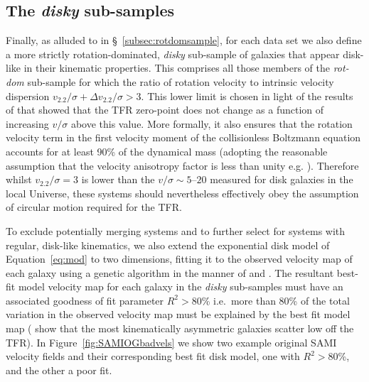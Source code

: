 \documentclass[a4paper,fleqn,usenatbib]{mnras}
\begin{document}
{\subsection{The \textit{disky} sub-samples}
\label{subsec:diskysample}

Finally, as alluded to in \S~\ref{subsec:rotdomsample}, for each data set we also define a more strictly rotation-dominated, \textit{disky} sub-sample of galaxies that appear disk-like in their kinematic properties. This comprises all those members of the \textit{rot-dom} sub-sample for which the ratio of rotation velocity to intrinsic velocity dispersion $v_{2.2}/\sigma + \Delta v_{2.2}/\sigma > 3$. This lower limit is chosen in light of the results of \citet{Tiley:2016} that showed that the TFR zero-point does not change as a function of increasing $v/\sigma$ above this value. More formally, it also ensures that the rotation velocity term in the first velocity moment of the collisionless Boltzmann equation accounts for at least 90\% of the dynamical mass (adopting the reasonable assumption that the velocity anisotropy factor is less than unity e.g. \citealt{Kormendy:2001}). Therefore whilst $v_{2.2}/\sigma=3$ is lower than the $v/\sigma\sim5$--$20$ \citep[][]{Epinat:2010} measured for disk galaxies in the local Universe, these systems should nevertheless effectively obey the assumption of circular motion required for the TFR.    

To exclude potentially merging systems and to further select for systems with regular, disk-like kinematics, we also extend the exponential disk model of Equation~\ref{eq:mod} to two dimensions, fitting it to the observed velocity map of each galaxy using a genetic algorithm \citep{Charb:1995} in the manner of \citet{Swinbank:2012b} and \citet{Stott:2016}. The resultant best-fit model velocity map for each galaxy in the \textit{disky} sub-samples must have an associated goodness of fit parameter $R^{2} > 80$\% i.e.\ more than $80$\% of the total variation in the observed velocity map must be explained by the best fit model map (\citealt{Bloom:2017} show that the most kinematically asymmetric galaxies scatter low off the TFR). In Figure~\ref{fig:SAMIOGbadvels} we show two example original SAMI velocity fields and their corresponding best fit disk model, one with $R^{2} > 80$\%, and the other a poor fit.

}
\end{document}
